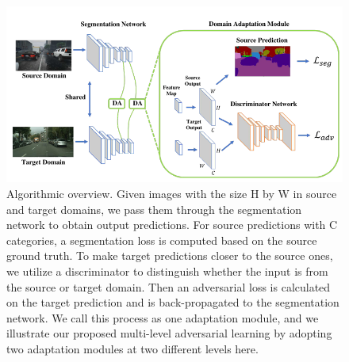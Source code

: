 \documentclass{article}
\begin{document}
	\begin{figure}[H]
		\centering
		\includegraphics[width=0.7\linewidth]{image/general/adversarial_model.png}
		\caption{Algorithmic overview. Given images with the size H by W in source and target domains, we pass them through the segmentation
		network to obtain output predictions. For source predictions with C categories, a segmentation loss is computed based on the source ground
		truth. To make target predictions closer to the source ones, we utilize a discriminator to distinguish whether the input is from the source or
		target domain. Then an adversarial loss is calculated on the target prediction and is back-propagated to the segmentation network. We call
		this process as one adaptation module, and we illustrate our proposed multi-level adversarial learning by adopting two adaptation modules
		at two different levels here.}
		\label{fig:adversarial_model}
	\end{figure}
	
\end{document}
